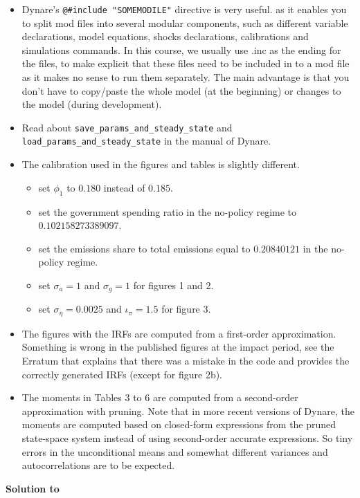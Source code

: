 \begin{itemize}

\item Dynare's \texttt{@\#include "SOMEMODILE"} directive is very useful.
  as it enables you to split mod files into several modular components,
  such as different variable declarations, model equations, shocks declarations, calibrations and simulations commands.
In this course, we usually use .inc as the ending for the files,
  to make explicit that these files need to be included in to a mod file as it makes no sense to run them separately.
The main advantage is that you don't have to copy/paste the whole model (at the beginning) or changes to the model (during development).

\item Read about \texttt{save\_params\_and\_steady\_state} and \texttt{load\_params\_and\_steady\_state} in the manual of Dynare.

\item The calibration used in the figures and tables is slightly different.
\begin{itemize}
  \item set $\phi_1$ to $0.180$ instead of $0.185$.
  \item set the government spending ratio in the no-policy regime to $0.102158273389097$.
  \item set the emissions share to total emissions equal to $0.20840121$ in the no-policy regime.
  \item set $\sigma_a=1$ and $\sigma_g=1$ for figures 1 and 2.
  \item set $\sigma_\eta=0.0025$ and $\iota_\pi=1.5$ for figure 3.
\end{itemize} 
  
\item The figures with the IRFs are computed from a first-order approximation.
Something is wrong in the published figures at the impact period,
  see the Erratum that explains that there was a mistake in the code
  and provides the correctly generated IRFs (except for figure 2b).

\item The moments in Tables 3 to 6 are computed from a second-order approximation with pruning.
Note that in more recent versions of Dynare,
  the moments are computed based on closed-form expressions from the pruned state-space system
  instead of using second-order accurate expressions.
So tiny errors in the unconditional means and somewhat different variances and autocorrelations are to be expected.

\end{itemize}


\begin{solution}\textbf{Solution to }
\ifDisplaySolutions

\fi
\newpage
\end{solution}